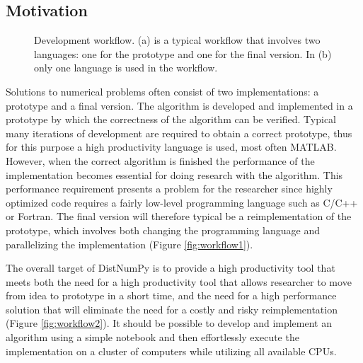 \documentclass{sigplanconf}
\begin{document}
\subsection{Motivation}
\begin{figure}%
  \begin{center}%
    \qquad
    \caption{Development workflow. (a) is a typical workflow that involves two languages: one for the prototype and one for the final version. In (b) only one language is used in the workflow.
    }%
    \label{fig:workflow}%
  \end{center}
\end{figure}

Solutions to numerical problems often consist of two implementations: a prototype and a final version. The algorithm is developed and implemented in a prototype by which the correctness of the algorithm can be verified. Typical many iterations of development are required to obtain a correct prototype, thus for this purpose a high productivity language is used, most often MATLAB. However, when the correct algorithm is finished the performance of the implementation becomes essential for doing research with the algorithm. This performance requirement presents a problem for the researcher since highly optimized code requires a fairly low-level programming language such as C/C++ or Fortran. The final version will therefore typical be a reimplementation of the prototype, which involves both changing the programming language and parallelizing the implementation (Figure \ref{fig:workflow1}). 

The overall target of DistNumPy is to provide a high productivity tool that meets both the need for a high productivity tool that allows researcher to move from idea to prototype in a short time, and the need for a high performance solution that will eliminate the need for a costly and risky reimplementation (Figure \ref{fig:workflow2}). It should be possible to develop and implement an algorithm using a simple notebook and then effortlessly execute the implementation on a cluster of computers while utilizing all available CPUs.
\end{document}
